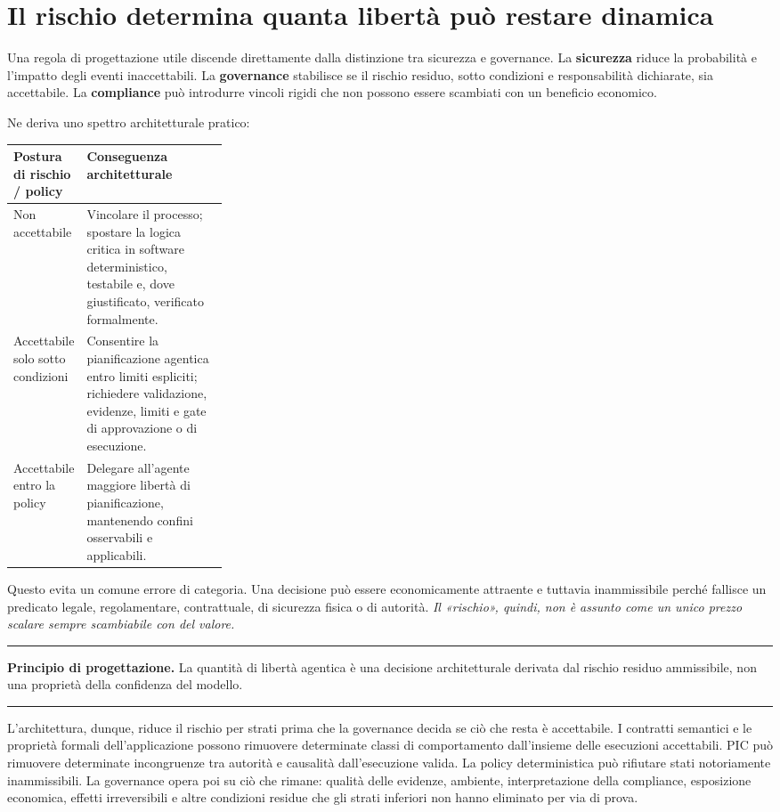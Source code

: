 \documentclass[10pt,oneside,openany]{book}
\newcommand{\term}[1]{\textbf{#1}}
\newcommand{\principle}[1]{%
  \vspace{4pt}
  \noindent\begin{minipage}{\linewidth}
  \hrule\vspace{5pt}
  \small\sffamily\raggedright\textbf{Principio di progettazione.} #1
  \vspace{5pt}\hrule
  \end{minipage}\vspace{4pt}
}
\begin{document}
\section{Il rischio determina quanta libertà può restare dinamica}

Una regola di progettazione utile discende direttamente dalla distinzione tra sicurezza e governance. La \term{sicurezza} riduce la probabilità e l'impatto degli eventi inaccettabili. La \term{governance} stabilisce se il rischio residuo, sotto condizioni e responsabilità dichiarate, sia accettabile. La \term{compliance} può introdurre vincoli rigidi che non possono essere scambiati con un beneficio economico.

Ne deriva uno spettro architetturale pratico:

\begin{center}
\begin{tabularx}{0.94\linewidth}{>{\raggedright\arraybackslash}p{0.28\linewidth} Y}
\toprule
\textbf{Postura di rischio / policy} & \textbf{Conseguenza architetturale} \\
\midrule
Non accettabile & Vincolare il processo; spostare la logica critica in software deterministico, testabile e, dove giustificato, verificato formalmente. \\
Accettabile solo sotto condizioni & Consentire la pianificazione agentica entro limiti espliciti; richiedere validazione, evidenze, limiti e gate di approvazione o di esecuzione. \\
Accettabile entro la policy & Delegare all'agente maggiore libertà di pianificazione, mantenendo confini osservabili e applicabili. \\
\bottomrule
\end{tabularx}
\end{center}

Questo evita un comune errore di categoria. Una decisione può essere economicamente attraente e tuttavia inammissibile perché fallisce un predicato legale, regolamentare, contrattuale, di sicurezza fisica o di autorità. \emph{Il «rischio», quindi, non è assunto come un unico prezzo scalare sempre scambiabile con del valore.}

\principle{La quantità di libertà agentica è una decisione architetturale derivata dal rischio residuo ammissibile, non una proprietà della confidenza del modello.}

L'architettura, dunque, riduce il rischio per strati prima che la governance decida se ciò che resta è accettabile. I contratti semantici e le proprietà formali dell'applicazione possono rimuovere determinate classi di comportamento dall'insieme delle esecuzioni accettabili. PIC può rimuovere determinate incongruenze tra autorità e causalità dall'esecuzione valida. La policy deterministica può rifiutare stati notoriamente inammissibili. La governance opera poi su ciò che rimane: qualità delle evidenze, ambiente, interpretazione della compliance, esposizione economica, effetti irreversibili e altre condizioni residue che gli strati inferiori non hanno eliminato per via di prova.
\end{document}
